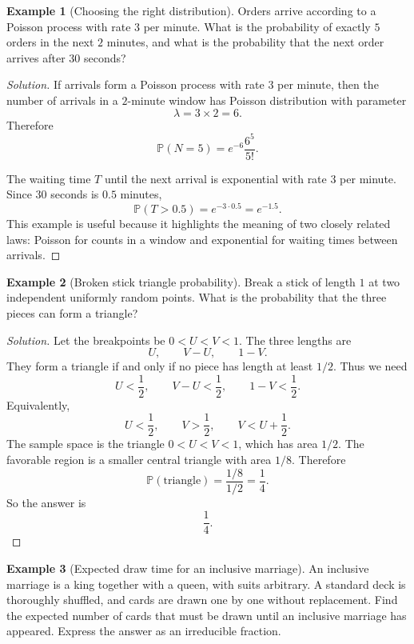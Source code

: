 \documentclass[11pt]{article}
\theoremstyle{definition}
\newtheorem{example}{Example}[section]
\begin{document}
\begin{example}[Choosing the right distribution]
Orders arrive according to a Poisson process with rate $3$ per minute. What is the probability of exactly $5$ orders in the next $2$ minutes, and what is the probability that the next order arrives after $30$ seconds?
\end{example}

\begin{proof}[Solution]
If arrivals form a Poisson process with rate $3$ per minute, then the number of arrivals in a $2$-minute window has Poisson distribution with parameter
\[
\lambda = 3\times 2 = 6.
\]
Therefore
\[
\mathbb{P}(N=5)=e^{-6}\frac{6^5}{5!}.
\]

The waiting time $T$ until the next arrival is exponential with rate $3$ per minute. Since $30$ seconds is $0.5$ minutes,
\[
\mathbb{P}(T>0.5)=e^{-3\cdot 0.5}=e^{-1.5}.
\]
This example is useful because it highlights the meaning of two closely related laws: Poisson for counts in a window and exponential for waiting times between arrivals.
\end{proof}

\begin{example}[Broken stick triangle probability]
Break a stick of length $1$ at two independent uniformly random points. What is the probability that the three pieces can form a triangle?
\end{example}

\begin{proof}[Solution]
Let the breakpoints be $0<U<V<1$. The three lengths are
\[
U, \qquad V-U, \qquad 1-V.
\]
They form a triangle if and only if no piece has length at least $1/2$. Thus we need
\[
U<\frac12, \qquad V-U<\frac12, \qquad 1-V<\frac12.
\]
Equivalently,
\[
U<\frac12, \qquad V>\frac12, \qquad V<U+\frac12.
\]
The sample space is the triangle $0<U<V<1$, which has area $1/2$. The favorable region is a smaller central triangle with area $1/8$. Therefore
\[
\mathbb{P}(\text{triangle}) = \frac{1/8}{1/2}=\frac14.
\]
So the answer is
\[
\boxed{\frac14}.
\]
\end{proof}

\begin{example}[Expected draw time for an inclusive marriage]
An inclusive marriage is a king together with a queen, with suits arbitrary. A standard deck is thoroughly shuffled, and cards are drawn one by one without replacement. Find the expected number of cards that must be drawn until an inclusive marriage has appeared. Express the answer as an irreducible fraction.
\end{example}
\end{document}

